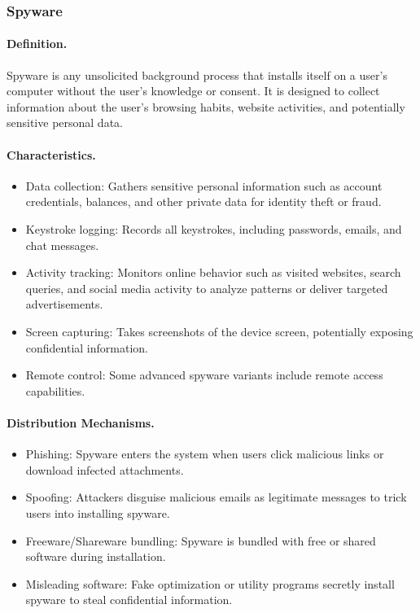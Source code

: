 \subsubsection{Spyware}

\paragraph{Definition.}
Spyware is any unsolicited background process that installs itself on a user's computer without the user's knowledge or consent. It is designed to collect information about the user's browsing habits, website activities, and potentially sensitive personal data.

\paragraph{Characteristics.}
\begin{itemize}
  \item Data collection: Gathers sensitive personal information such as account credentials, balances, and other private data for identity theft or fraud.
  \item Keystroke logging: Records all keystrokes, including passwords, emails, and chat messages.
  \item Activity tracking: Monitors online behavior such as visited websites, search queries, and social media activity to analyze patterns or deliver targeted advertisements.
  \item Screen capturing: Takes screenshots of the device screen, potentially exposing confidential information.
  \item Remote control: Some advanced spyware variants include remote access capabilities.
\end{itemize}

\paragraph{Distribution Mechanisms.}
\begin{itemize}
  \item Phishing: Spyware enters the system when users click malicious links or download infected attachments.
  \item Spoofing: Attackers disguise malicious emails as legitimate messages to trick users into installing spyware.
  \item Freeware/Shareware bundling: Spyware is bundled with free or shared software during installation.
  \item Misleading software: Fake optimization or utility programs secretly install spyware to steal confidential information.
\end{itemize}

